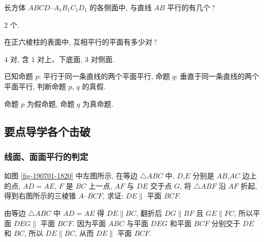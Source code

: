 \lianxi
\begin{exercise}
    长方体 $ABCD\text{--}A_1 B_1 C_1 D_1$ 的各侧面中, 与直线 $AB$ 平行的有几个\,?
\end{exercise}
\beginsolution
    $2$ 个.
\endsolution

\begin{exercise}
    在正六棱柱的表面中, 互相平行的平面有多少对\,?
\end{exercise}
\beginsolution
    $4$ 对, 含 $1$ 对上、下底面, $3$ 对侧面.
\endsolution

\begin{exercise}
    已知命题 $p$: 平行于同一条直线的两个平面平行, 命题 $q$: 垂直于同一条直线的两个平面平行, 判断命题 $p$, $q$ 的真假.
\end{exercise}
\beginsolution
    命题 $p$ 为假命题, 命题 $q$ 为真命题.
\endsolution

\subsection{要点导学\quad 各个击破}
\subsubsection{线面、面面平行的判定}
\begin{example}
    如图 \ref{fig-190701-1820} 中左图所示, 在等边 $\triangle ABC$ 中, $D$,$E$ 分别是 $AB$,$AC$ 边上的点, $AD=AE$, $F$ 是 $BC$ 上一点, $AF$ 与 $DE$ 交于点 $G$, 将 $\triangle ABF$ 沿 $AF$ 折起, 得到右图所示的三棱锥 $A\text{--}BCF$, 求证: $DE\parallel$ 平面 $BCF$.
\end{example}
\beginsolution
    由等边 $\triangle ABC$ 中 $AD=AE$ 得 $DE\parallel BC$, 翻折后 $DG\parallel BF$ 且 $GE\parallel FC$, 所以平面 $DEG\parallel$ 平面 $BCF$. 因为平面 $ABC$ 与平面 $DEG$ 和平面 $BCF$ 分别交于 $DE$ 和 $BC$, 所以 $DE\parallel BC$, 从而 $DE\parallel$ 平面 $BCF$.
\endsolution

